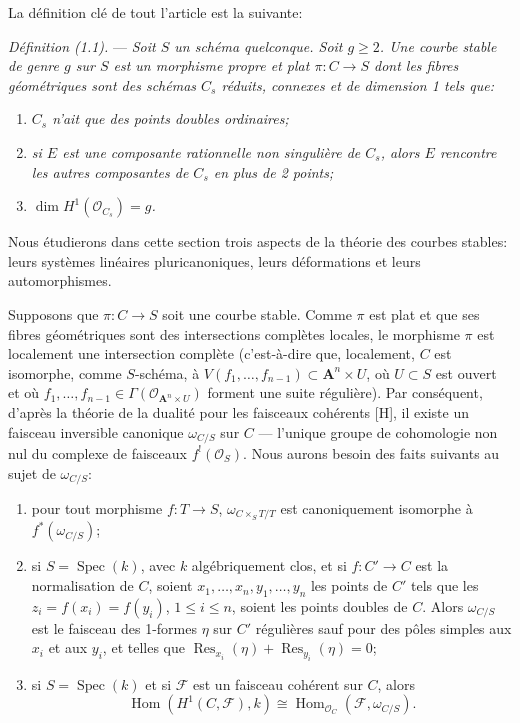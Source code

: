 \documentclass[10pt]{article}
\newcommand{\Spec}{\operatorname{Spec}}
\newcommand{\Hom}{\operatorname{Hom}}
\newcommand{\Res}{\operatorname{Res}}
\newcommand{\cO}{\mathcal O}
\newcommand{\cF}{\mathcal F}
\newcommand{\A}{\mathbf A}
\begin{document}
La définition clé de tout l'article est la suivante:

\medskip
\noindent\textit{Définition (1.1).} --- \textit{Soit $S$ un schéma quelconque. Soit $g\geq 2$. Une courbe stable de genre $g$ sur $S$ est un morphisme propre et plat $\pi:C\to S$ dont les fibres géométriques sont des schémas $C_s$ réduits, connexes et de dimension 1 tels que:}
\begin{enumerate}[label=(\roman*)]
\item \textit{$C_s$ n'ait que des points doubles ordinaires;}
\item \textit{si $E$ est une composante rationnelle non singulière de $C_s$, alors $E$ rencontre les autres composantes de $C_s$ en plus de 2 points;}
\item \textit{$\dim H^1(\cO_{C_s})=g$.}
\end{enumerate}

Nous étudierons dans cette section trois aspects de la théorie des courbes stables: leurs systèmes linéaires pluricanoniques, leurs déformations et leurs automorphismes.

Supposons que $\pi:C\to S$ soit une courbe stable. Comme $\pi$ est plat et que ses fibres géométriques sont des intersections complètes locales, le morphisme $\pi$ est localement une intersection complète (c'est-à-dire que, localement, $C$ est isomorphe, comme $S$-schéma, à $V(f_1,\ldots,f_{n-1})\subset \A^n\times U$, où $U\subset S$ est ouvert et où $f_1,\ldots,f_{n-1}\in\Gamma(\cO_{\A^n\times U})$ forment une suite régulière). Par conséquent, d'après la théorie de la dualité pour les faisceaux cohérents [H], il existe un faisceau inversible canonique $\omega_{C/S}$ sur $C$ --- l'unique groupe de cohomologie non nul du complexe de faisceaux $f^!(\cO_S)$. Nous aurons besoin des faits suivants au sujet de $\omega_{C/S}$:
\begin{enumerate}[label=\alph*)]
\item pour tout morphisme $f:T\to S$, $\omega_{C\times_S T/T}$ est canoniquement isomorphe à $f^*(\omega_{C/S})$;
\item si $S=\Spec(k)$, avec $k$ algébriquement clos, et si $f:C'\to C$ est la normalisation de $C$, soient $x_1,\ldots,x_n,y_1,\ldots,y_n$ les points de $C'$ tels que les $z_i=f(x_i)=f(y_i)$, $1\leq i\leq n$, soient les points doubles de $C$. Alors $\omega_{C/S}$ est le faisceau des 1-formes $\eta$ sur $C'$ régulières sauf pour des pôles simples aux $x_i$ et aux $y_i$, et telles que $\Res_{x_i}(\eta)+\Res_{y_i}(\eta)=0$;
\item si $S=\Spec(k)$ et si $\cF$ est un faisceau cohérent sur $C$, alors
\[
\Hom(H^1(C,\cF),k)\cong \Hom_{\cO_C}(\cF,\omega_{C/S}).
\]
\end{enumerate}
\end{document}
